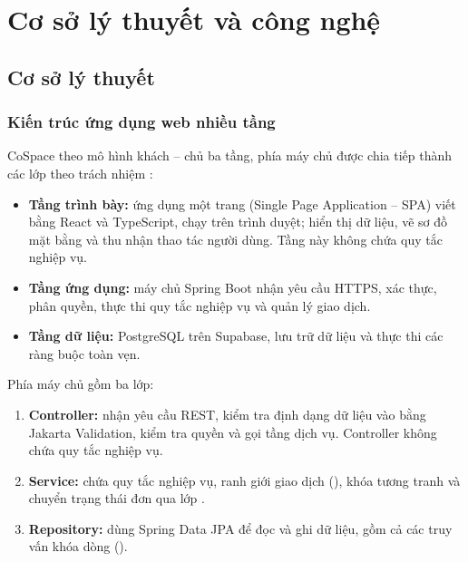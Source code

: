 \chapter{Cơ sở lý thuyết và công nghệ}
\label{ch:cosolythuyet}

\section{Cơ sở lý thuyết}
\label{sec:coso_lythuyet}

\subsection{Kiến trúc ứng dụng web nhiều tầng}
CoSpace theo mô hình khách -- chủ ba tầng, phía máy chủ được chia tiếp thành các lớp theo trách nhiệm \cite{martin2017clean}:
\begin{itemize}
    \item \textbf{Tầng trình bày:} ứng dụng một trang (Single Page Application -- SPA) viết bằng React và TypeScript, chạy trên trình duyệt; hiển thị dữ liệu, vẽ sơ đồ mặt bằng và thu nhận thao tác người dùng. Tầng này không chứa quy tắc nghiệp vụ.
    \item \textbf{Tầng ứng dụng:} máy chủ Spring Boot nhận yêu cầu HTTPS, xác thực, phân quyền, thực thi quy tắc nghiệp vụ và quản lý giao dịch.
    \item \textbf{Tầng dữ liệu:} PostgreSQL trên Supabase, lưu trữ dữ liệu và thực thi các ràng buộc toàn vẹn.
\end{itemize}


Phía máy chủ gồm ba lớp:
\begin{enumerate}
    \item \textbf{Controller:} nhận yêu cầu REST, kiểm tra định dạng dữ liệu vào bằng Jakarta Validation, kiểm tra quyền và gọi tầng dịch vụ. Controller không chứa quy tắc nghiệp vụ.
    \item \textbf{Service:} chứa quy tắc nghiệp vụ, ranh giới giao dịch (), khóa tương tranh và chuyển trạng thái đơn qua lớp .
    \item \textbf{Repository:} dùng Spring Data JPA để đọc và ghi dữ liệu, gồm cả các truy vấn khóa dòng ().
\end{enumerate}

